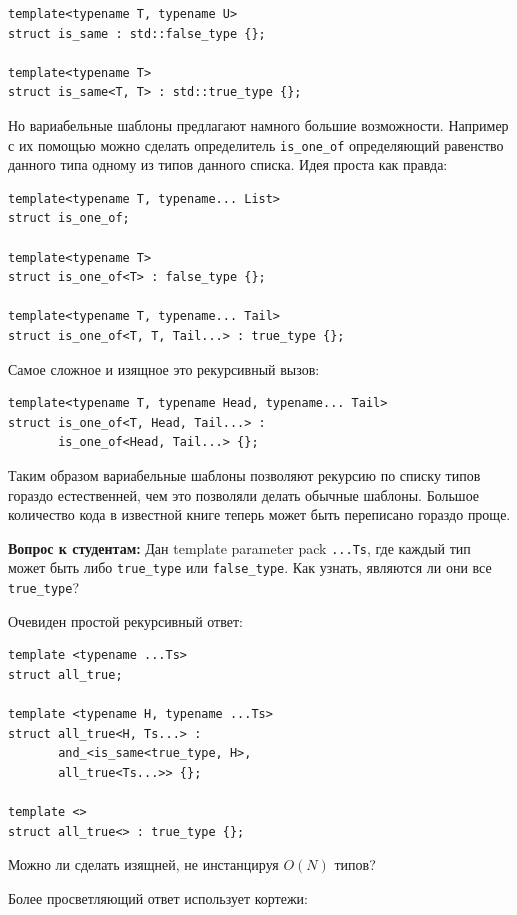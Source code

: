 \documentclass[a4paper,12pt,oneside]{article}
\newif\ifanswers
\begin{document}
\begin{lstlisting}
template<typename T, typename U>
struct is_same : std::false_type {};
 
template<typename T>
struct is_same<T, T> : std::true_type {};
\end{lstlisting}

Но вариабельные шаблоны предлагают намного большие возможности. Например с их помощью можно сделать определитель \lstinline!is_one_of! определяющий равенство данного типа одному из типов данного списка. Идея проста как правда:

\begin{lstlisting}
template<typename T, typename... List>
struct is_one_of;

template<typename T>
struct is_one_of<T> : false_type {};

template<typename T, typename... Tail>
struct is_one_of<T, T, Tail...> : true_type {};
\end{lstlisting}

Самое сложное и изящное это рекурсивный вызов:

\begin{lstlisting}
template<typename T, typename Head, typename... Tail>
struct is_one_of<T, Head, Tail...> : 
       is_one_of<Head, Tail...> {};
\end{lstlisting}

Таким образом вариабельные шаблоны позволяют рекурсию по списку типов гораздо естественней, чем это позволяли делать обычные шаблоны. Большое количество кода в известной книге \cite{mcpp} теперь может быть переписано гораздо проще.

\textbf{Вопрос к студентам:} Дан template parameter pack \lstinline!...Ts!, где каждый тип может быть либо \lstinline!true_type! или \lstinline!false_type!. Как узнать, являются ли они все \lstinline!true_type!?

Очевиден простой рекурсивный ответ:

\begin{lstlisting}
template <typename ...Ts>
struct all_true;

template <typename H, typename ...Ts>
struct all_true<H, Ts...> : 
       and_<is_same<true_type, H>, 
       all_true<Ts...>> {};

template <>
struct all_true<> : true_type {};
\end{lstlisting}

Можно ли сделать изящней, не инстанцируя $O(N)$ типов?

\ifanswers
Более просветляющий ответ использует кортежи:
\end{document}
